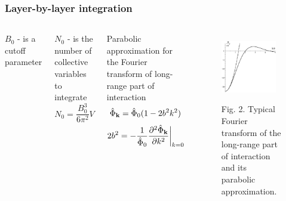 \documentclass[8pt]{beamer}
\begin{document}
	\begin{frame}
		\frametitle{Layer-by-layer integration}
		
		\begin{columns}
			$B_0$ - is a cutoff parameter
			
			$N_0$ - is the number of collective variables to integrate
			\begin{equation*}
				N_0 = \frac{B_0^3}{6\pi^2}V
			\end{equation*}
			
			Parabolic approximation for the Fourier transform of long-range part of interaction
			\begin{equation*}
				\hat{\Phi}_{\vb k} = \hat{\Phi}_{0}(1 - 2b^2k^2)
			\end{equation*}
			\begin{equation*}
				2b^2 = - \frac{1}{\hat{\Phi}_{0}} \frac{\partial^2 \hat{\Phi}_{\vb k}}{\partial k^2} \bigg|_{k=0}
			\end{equation*}
			
			\begin{figure}[htbp]
				\includegraphics[width=0.9\textwidth,angle=0]{fourier_and_parabolic_potential} \\
				\parbox{0.8\textwidth}{\caption*{Fig. 2. Typical Fourier transform of the long-range part of interaction and its parabolic approximation.
				}}
			\end{figure}
		\end{columns}
	\end{frame}
	
\end{document}
